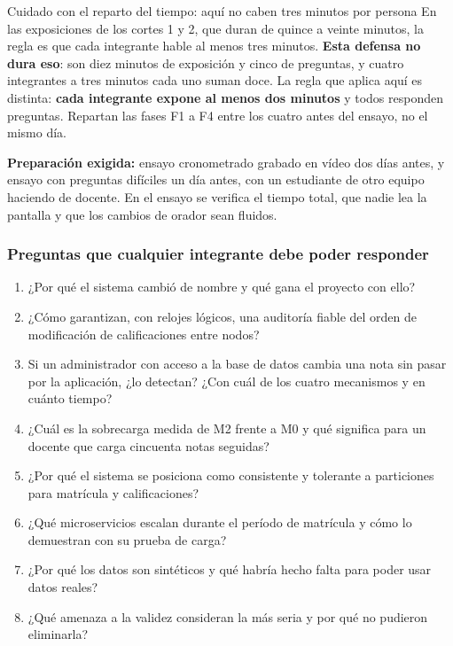 \documentclass[11pt,a4paper]{article}
\begin{document}
	\begin{avisoBox}{Cuidado con el reparto del tiempo: aquí no caben tres minutos por persona}
		En las exposiciones de los cortes 1 y 2, que duran de quince a veinte minutos, la regla es que cada integrante hable al menos tres minutos. \textbf{Esta defensa no dura eso}: son diez minutos de exposición y cinco de preguntas, y cuatro integrantes a tres minutos cada uno suman doce. La regla que aplica aquí es distinta: \textbf{cada integrante expone al menos dos minutos} y todos responden preguntas. Repartan las fases F1 a F4 entre los cuatro antes del ensayo, no el mismo día.
	\end{avisoBox}
	
	\textbf{Preparación exigida:} ensayo cronometrado grabado en vídeo dos días antes, y ensayo con preguntas difíciles un día antes, con un estudiante de otro equipo haciendo de docente. En el ensayo se verifica el tiempo total, que nadie lea la pantalla y que los cambios de orador sean fluidos.
	
	\subsubsection{Preguntas que cualquier integrante debe poder responder}
	
	\begin{enumerate}[leftmargin=*,itemsep=3pt]
		\item ¿Por qué el sistema cambió de nombre y qué gana el proyecto con ello?
		\item ¿Cómo garantizan, con relojes lógicos, una auditoría fiable del orden de modificación de calificaciones entre nodos?
		\item Si un administrador con acceso a la base de datos cambia una nota sin pasar por la aplicación, ¿lo detectan? ¿Con cuál de los cuatro mecanismos y en cuánto tiempo?
		\item ¿Cuál es la sobrecarga medida de M2 frente a M0 y qué significa para un docente que carga cincuenta notas seguidas?
		\item ¿Por qué el sistema se posiciona como consistente y tolerante a particiones para matrícula y calificaciones?
		\item ¿Qué microservicios escalan durante el período de matrícula y cómo lo demuestran con su prueba de carga?
		\item ¿Por qué los datos son sintéticos y qué habría hecho falta para poder usar datos reales?
		\item ¿Qué amenaza a la validez consideran la más seria y por qué no pudieron eliminarla?
	\end{enumerate}
	
\end{document}
